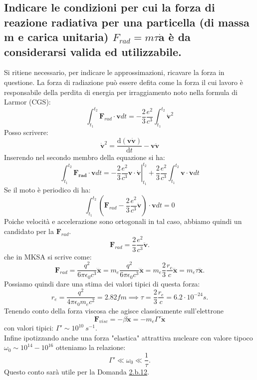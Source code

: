 \subsection[$\ $ Forza di reazione radiativa]{Indicare le condizioni per cui la forza di reazione radiativa per una particella (di massa m e carica unitaria) $F_{rad} = m \tau \dot{\boldsymbol{a}}$ è da considerarsi valida ed utilizzabile.} \label{subsec: 2.a.15}
Si ritiene necessario, per indicare le approssimazioni, ricavare la forza in questione. 
La forza di radiazione può essere defita come la forza il cui lavoro è responsabile della perdita di energia per irraggiamento noto nella formula di Larmor (CGS):
\[
	\int_{t_1}^{t_2} \boldsymbol{F}_{rad} \cdot \boldsymbol{v} dt = -\frac{2}{3} \frac{e^2}{c^3} \int_{t_1}^{t_2} \dot{\boldsymbol{v}}^2
\]
Posso scrivere:
\[
	\dot{\boldsymbol{v}}^2 = \frac{\mbox{d} \left( \boldsymbol{v} \dot{\boldsymbol{v}} \right) }{\mbox{d} t} - \boldsymbol{v} \ddot{\boldsymbol{v}} 
\]
Inserendo nel secondo membro della equazione si ha:
\[
	\int_{t_1}^{t_2}{ \boldsymbol{F_{rad}} \cdot \boldsymbol{v} dt } = -
\left. \frac{2}{3}\frac{e^2}{c^3} \boldsymbol{v} \cdot \dot{\boldsymbol{v}}\right|_{t_{1}}^{t_{2}} + \frac{2}{3}\frac{e^2}{c^3} \int_{t_1}^{t_2} \boldsymbol{v}  \cdot \ddot{\boldsymbol{v}} dt
\] 
Se il moto è periodico di ha: 
\[
	\int_{t_1}^{t_2} \left( \boldsymbol{F}_{rad} - \frac{2}{3}\frac{e^2}{c^3}\ddot{\boldsymbol{v}} \right) \cdot \boldsymbol{v} dt = 0  
\] 
Poiche velocità e accelerazione sono ortogonali in tal caso, abbiamo quindi un candidato per la $\boldsymbol{F}_{rad}$.
\[
	\boldsymbol{F}_{rad} = \frac{2}{3}\frac{e^2}{c^3} \ddot{\boldsymbol{v}}.  
\] 
che in MKSA si scrive come:
\[
	\boldsymbol{F}_{rad} = \frac{q^2}{6\pi \epsilon_0 c^3} \dddot{\boldsymbol{x}} = m_{e}\frac{q^2}{6\pi \epsilon_0 c^3} \dddot{\boldsymbol{x}} = m_e \frac{2}{3}\frac{r_e}{c} \dddot{\boldsymbol{x}} = m_e \tau \dddot{\boldsymbol{x}} 
.\] 
Possiamo quindi dare una stima dei valori tipici di questa forza:
\[
r_e = \frac{q^2}{4\pi \epsilon_0 m_e c^2} = 2.82 fm \implies \tau = \frac{2}{3}\frac{r_e}{c} = 6.2 \cdot 10^{-24} s 
.\] \label{eq: raggio classico} 
Tenendo conto della forza viscosa che agisce classicamente sull'elettrone 
\[
	\boldsymbol{F}_{visc} = -\beta \dot{\boldsymbol{x}} = - m_e \Gamma' \dot{\boldsymbol{x}} 
\]
con valori tipici: $\Gamma' \sim 10^{10} \ s^{-1}$.\\
Infine ipotizzando anche una forza "elastica" attrattiva nucleare con valore tipoco $\omega_{0} \sim 10^{14} - 10^{16}$ otteniamo la relazione:
\[
\Gamma' \ll \omega_{0} \ll \frac{1}{\tau}
.\] \label{eq:relazione-parametri-elettrone} 
Questo conto sarà utile per la Domanda \hyperref[subsec: 2.b.12]{2.b.12}.

